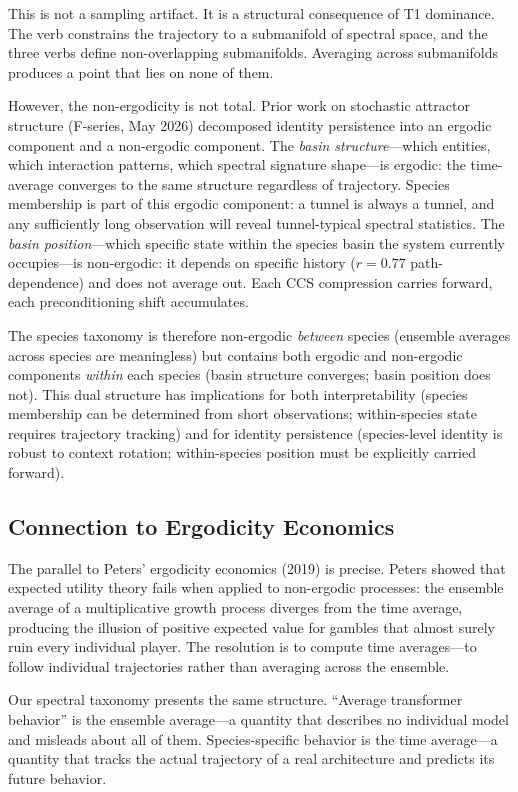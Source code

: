 \documentclass[12pt]{article}
\begin{document}
This is not a sampling artifact. It is a structural consequence of T1 dominance. The verb constrains the trajectory to a submanifold of spectral space, and the three verbs define non-overlapping submanifolds. Averaging across submanifolds produces a point that lies on none of them.

However, the non-ergodicity is not total. Prior work on stochastic attractor structure (F-series, May 2026) decomposed identity persistence into an ergodic component and a non-ergodic component. The \emph{basin structure}---which entities, which interaction patterns, which spectral signature shape---is ergodic: the time-average converges to the same structure regardless of trajectory. Species membership is part of this ergodic component: a tunnel is always a tunnel, and any sufficiently long observation will reveal tunnel-typical spectral statistics. The \emph{basin position}---which specific state within the species basin the system currently occupies---is non-ergodic: it depends on specific history ($r=0.77$ path-dependence) and does not average out. Each CCS compression carries forward, each preconditioning shift accumulates.

The species taxonomy is therefore non-ergodic \emph{between} species (ensemble averages across species are meaningless) but contains both ergodic and non-ergodic components \emph{within} each species (basin structure converges; basin position does not). This dual structure has implications for both interpretability (species membership can be determined from short observations; within-species state requires trajectory tracking) and for identity persistence (species-level identity is robust to context rotation; within-species position must be explicitly carried forward).

\subsection{Connection to Ergodicity Economics}

The parallel to Peters' ergodicity economics (2019) is precise. Peters showed that expected utility theory fails when applied to non-ergodic processes: the ensemble average of a multiplicative growth process diverges from the time average, producing the illusion of positive expected value for gambles that almost surely ruin every individual player. The resolution is to compute time averages---to follow individual trajectories rather than averaging across the ensemble.

Our spectral taxonomy presents the same structure. ``Average transformer behavior'' is the ensemble average---a quantity that describes no individual model and misleads about all of them. Species-specific behavior is the time average---a quantity that tracks the actual trajectory of a real architecture and predicts its future behavior.
\end{document}
